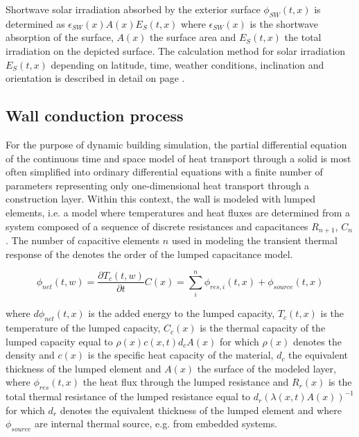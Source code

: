  Shortwave solar irradiation absorbed by the exterior surface $\phi_{SW}(t,x)$ is determined as $\epsilon_{SW}(x) A(x) E_{S}(t,x)$ where $\epsilon_{SW}(x)$ is the shortwave absorption of the surface, $A(x)$ the surface area and $E_{S}(t,x)$ the total irradiation on the depicted surface. The calculation method for solar irradiation $E_{S}(t,x)$ depending on latitude, time, weather conditions, inclination and orientation is described in detail on page \pageref{chap:climsol}. 

\subsection{Wall conduction process}


For the purpose of dynamic building simulation, the partial differential equation of the continuous time and space model of heat transport through a solid is most often simplified into ordinary differential equations with a finite number of parameters representing only one-dimensional heat transport through a construction layer. Within this context, the wall is modeled with lumped elements, i.e. a model where temperatures and heat fluxes are determined from a system composed of a sequence of discrete resistances and capacitances $R_{n+1}$, $C_{n}$. The number of capacitive elements $n$ used in modeling the transient thermal response of the  denotes the order of the lumped capacitance model. 

\begin{equation}
\phi_{net}(t,w) = \frac{\partial T_{c}(t,w)}{\partial t}C(x) = \sum_{i}^{n} \phi_{res,i}(t,x) + \phi_{source}(t,x)
\end{equation}

where $d\phi_{net}(t,x)$ is the added energy to the lumped capacity, $T_{c}(t,x)$ is the temperature of the lumped capacity, $C_{c}(x)$ is the thermal capacity of the lumped capacity equal to $\rho(x)c(x,t)d_{c}A(x)$ for which $\rho(x)$ denotes the density and $c(x)$ is the specific heat capacity of the material, $d_{c}$ the equivalent thickness of the lumped element and $A(x)$ the surface of the modeled layer, where $\phi_{res}(t,x)$ the heat flux through the lumped resistance and $R_{r}(x)$ is the total thermal resistance of the lumped resistance equal to $d_{r}\left(\lambda(x,t)A(x)\right)^{-1}$ for which $d_{r}$ denotes the equivalent thickness of the lumped element and where $\phi_{source}$ are internal thermal source, e.g. from embedded systems.

